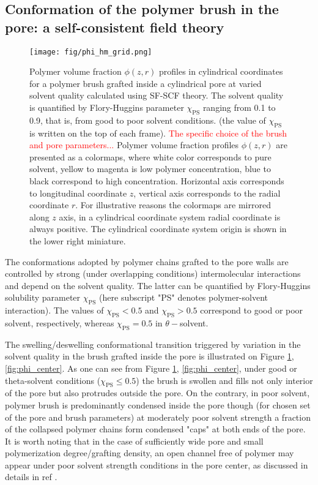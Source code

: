 \documentclass[12pt, a4paper]{article}
\newcommand\todo[1]{\textcolor{red}{#1}}
\begin{document}
\subsection{Conformation of the polymer brush in the pore: a self-consistent field theory }




\begin{figure}
    \centering
    \texttt{[image: fig/phi\_hm\_grid.png]}
    \caption{
    Polymer volume fraction $\phi(z,r)$ profiles in cylindrical coordinates for a polymer brush grafted inside a cylindrical pore at varied solvent quality calculated using SF-SCF theory. 
    The solvent quality is quantified  by Flory-Huggins parameter $\chi_{\textrm{PS}}$ ranging from 0.1 to 0.9, that is, from good to poor solvent conditions.
    (the value of $\chi_{\textrm{PS}}$ is written on the top of each frame).
    \todo{The specific choice of the brush and pore parameters...}
    Polymer volume fraction profiles $\phi(z,r)$ are presented as a colormaps,
    where white color corresponds to pure solvent, yellow to magenta is low polymer concentration, blue to black correspond to high concentration.
    Horizontal axis corresponds to longitudinal coordinate $z$, vertical axis corresponds to the radial coordinate $r$.
    For illustrative reasons the colormaps are mirrored along $z$ axis, in a cylindrical coordinate system radial coordinate is always positive.
    The cylindrical coordinate system origin is shown in the lower right miniature.
    }
    \label{fig:phi_hm_grid}
\end{figure}

The conformations adopted by polymer chains grafted to the pore walls are controlled by strong (under overlapping conditions) intermolecular interactions and depend on the solvent quality. 
The latter can be quantified by Flory-Huggins solubility parameter $\chi_{\textrm{PS}}$ (here subscript "PS" denotes polymer-solvent interaction). 
The values of $\chi_{\textrm{PS}}<0.5$ and $\chi_{\textrm{PS}}>0.5$ correspond to good or poor solvent, respectively, whereas $\chi_{\textrm{PS}}=0.5$ in $\theta-$solvent.


The swelling/deswelling conformational transition triggered by variation in the solvent quality in the brush grafted inside the pore is illustrated on Figure \ref{fig:phi_hm_grid}, \ref{fig:phi_center}.
As one can see from Figure \ref{fig:phi_hm_grid}, \ref{fig:phi_center},
under good or theta-solvent conditions ($\chi_{\textrm{PS}}\leq 0.5$) the brush is swollen and fills not only interior of the pore but also protrudes outside the pore. 
On the contrary, in poor solvent, polymer brush is predominantly condensed inside the pore though (for chosen set of the pore and brush parameters) at moderately poor solvent strength
a fraction of the collapsed polymer chains form condensed "caps" at both ends of the pore.
It is worth noting that in the case of sufficiently wide pore and small polymerization degree/grafting density, an open channel free of polymer 
may appear under poor solvent strength conditions in the pore center, as discussed in details in ref \cite{Laktionov_Polymers}.
\end{document}
